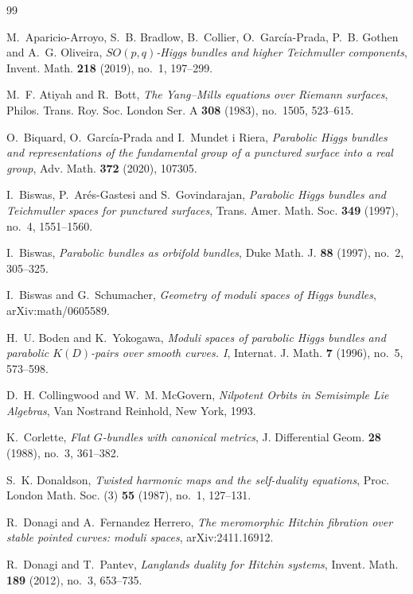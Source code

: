 \documentclass[11pt,reqno]{amsart}
\numberwithin{equation}{section}
\theoremstyle{plain}
\theoremstyle{definition}
\theoremstyle{remark}
\begin{document}
\begin{thebibliography}{99}

M.~Aparicio-Arroyo, S.~B. Bradlow, B.~Collier, O.~Garc\'ia-Prada,
P.~B. Gothen and A.~G. Oliveira,
\emph{\(SO(p,q)\)-Higgs bundles and higher Teichmuller components},
Invent. Math. \textbf{218} (2019), no.~1, 197--299.

M.~F. Atiyah and R.~Bott,
\emph{The Yang--Mills equations over Riemann surfaces},
Philos. Trans. Roy. Soc. London Ser. A \textbf{308} (1983), no.~1505,
523--615.

O.~Biquard, O.~Garc\'ia-Prada and I.~Mundet i Riera,
\emph{Parabolic Higgs bundles and representations of the fundamental group of
a punctured surface into a real group},
Adv. Math. \textbf{372} (2020), 107305.

I.~Biswas, P.~Ar\'es-Gastesi and S.~Govindarajan,
\emph{Parabolic Higgs bundles and Teichmuller spaces for punctured surfaces},
Trans. Amer. Math. Soc. \textbf{349} (1997), no.~4, 1551--1560.

I.~Biswas,
\emph{Parabolic bundles as orbifold bundles},
Duke Math. J. \textbf{88} (1997), no.~2, 305--325.

I.~Biswas and G.~Schumacher,
\emph{Geometry of moduli spaces of Higgs bundles},
arXiv:math/0605589.

H.~U. Boden and K.~Yokogawa,
\emph{Moduli spaces of parabolic Higgs bundles and parabolic \(K(D)\)-pairs
over smooth curves. I},
Internat. J. Math. \textbf{7} (1996), no.~5, 573--598.

D.~H. Collingwood and W.~M. McGovern,
\emph{Nilpotent Orbits in Semisimple Lie Algebras},
Van Nostrand Reinhold, New York, 1993.

K.~Corlette,
\emph{Flat \(G\)-bundles with canonical metrics},
J. Differential Geom. \textbf{28} (1988), no.~3, 361--382.

S.~K. Donaldson,
\emph{Twisted harmonic maps and the self-duality equations},
Proc. London Math. Soc. (3) \textbf{55} (1987), no.~1, 127--131.

R.~Donagi and A.~Fernandez Herrero,
\emph{The meromorphic Hitchin fibration over stable pointed curves: moduli spaces},
arXiv:2411.16912.


R.~Donagi and T.~Pantev,
\emph{Langlands duality for Hitchin systems},
Invent. Math. \textbf{189} (2012), no.~3, 653--735.


\end{thebibliography}
\end{document}
